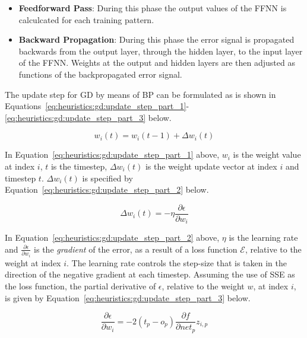 \begin{itemize}
      \item \textbf{Feedforward Pass}: During this phase the output values of the \acs{FFNN} is calculcated for each training pattern.

      \item \textbf{Backward Propagation}: During this phase the error signal is propagated backwards from the output layer, through the hidden layer, to the input layer of the \acs{FFNN}. Weights at the output and hidden layers are then adjusted as functions of the backpropagated error signal.
\end{itemize}

\noindent
The update step for \acs{GD} by means of \acs{BP} can be formulated as is shown in Equations~\eqref{eq:heuristics:gd:update_step_part_1}-\eqref{eq:heuristics:gd:update_step_part_3} below.

\begin{equation}
      \label{eq:heuristics:gd:update_step_part_1}
      w_{i}(t) = w_{i}(t-1) + \Delta w_{i}(t)
\end{equation}

\noindent
In Equation~\eqref{eq:heuristics:gd:update_step_part_1} above, $w_{i}$ is the weight value at index $i$, $t$ is the timestep, $\Delta w_{i}(t)$ is the weight update vector at index $i$ and timestep $t$. $\Delta w_{i}(t)$ is specified by Equation~\eqref{eq:heuristics:gd:update_step_part_2} below.

\begin{equation}
      \label{eq:heuristics:gd:update_step_part_2}
      \Delta w_{i}(t) = -\eta\frac{\partial \epsilon}{\partial w_{i}}
\end{equation}

\noindent
In Equation~\eqref{eq:heuristics:gd:update_step_part_2} above, $\eta$ is the learning rate and $\frac{\partial \epsilon}{\partial w_{i}}$ is the \textit{gradient} of the error, as a result of a loss function $\mathcal{E}$, relative to the weight at index $i$. The learning rate controls the step-size that is taken in the direction of the negative gradient at each timestep. Assuming the use of \acs{SSE} as the loss function, the partial derivative of $\epsilon$, relative to the weight $w$, at index $i$, is given by Equation~\eqref{eq:heuristics:gd:update_step_part_3} below.

\begin{equation}
      \label{eq:heuristics:gd:update_step_part_3}
      \frac{\partial \epsilon}{\partial w_{i}} = -2(t_{p} - o_{p})\frac{\partial f}{\partial net_{p}}z_{i,p}
\end{equation}

